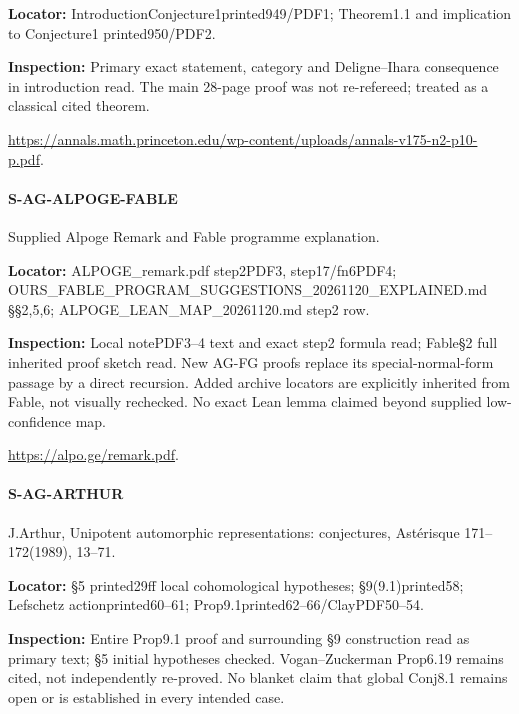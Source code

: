 \documentclass[11pt,a4paper]{article}
\begin{document}
\textbf{Locator:} IntroductionConjecture1printed949/\allowbreak{}PDF1; Theorem1.\allowbreak{}1 and implication to Conjecture1 printed950/\allowbreak{}PDF2.

\textbf{Inspection:} Primary exact statement, category and Deligne–\allowbreak{}Ihara consequence in introduction read.\allowbreak{} The main 28-page proof was not re-refereed; treated as a classical cited theorem.\allowbreak{}

\url{https://annals.math.princeton.edu/wp-content/uploads/annals-v175-n2-p10-p.pdf}.

\paragraph{S-AG-ALPOGE-FABLE} Supplied Alpoge Remark and Fable programme explanation.

\textbf{Locator:} ALPOGE\_\allowbreak{}remark.\allowbreak{}pdf step2PDF3, step17/\allowbreak{}fn6PDF4; OURS\_\allowbreak{}FABLE\_\allowbreak{}PROGRAM\_\allowbreak{}SUGGESTIONS\_\allowbreak{}20261120\_\allowbreak{}EXPLAINED.\allowbreak{}md §§2,5,6; ALPOGE\_\allowbreak{}LEAN\_\allowbreak{}MAP\_\allowbreak{}20261120.\allowbreak{}md step2 row.

\textbf{Inspection:} Local notePDF3–\allowbreak{}4 text and exact step2 formula read; Fable§2 full inherited proof sketch read.\allowbreak{} New AG-FG proofs replace its special-normal-form passage by a direct recursion.\allowbreak{} Added archive locators are explicitly inherited from Fable, not visually rechecked.\allowbreak{} No exact Lean lemma claimed beyond supplied low-confidence map.\allowbreak{}

\url{https://alpo.ge/remark.pdf}.

\paragraph{S-AG-ARTHUR} J.\allowbreak{}Arthur, Unipotent automorphic representations:\allowbreak{} conjectures, Astérisque 171–\allowbreak{}172(1989), 13–\allowbreak{}71.

\textbf{Locator:} §5 printed29ff local cohomological hypotheses; §9(9.\allowbreak{}1)printed58; Lefschetz actionprinted60–\allowbreak{}61; Prop9.\allowbreak{}1printed62–\allowbreak{}66/\allowbreak{}ClayPDF50–\allowbreak{}54.

\textbf{Inspection:} Entire Prop9.\allowbreak{}1 proof and surrounding §9 construction read as primary text; §5 initial hypotheses checked.\allowbreak{} Vogan–\allowbreak{}Zuckerman Prop6.\allowbreak{}19 remains cited, not independently re-proved.\allowbreak{} No blanket claim that global Conj8.\allowbreak{}1 remains open or is established in every intended case.\allowbreak{}
\end{document}
